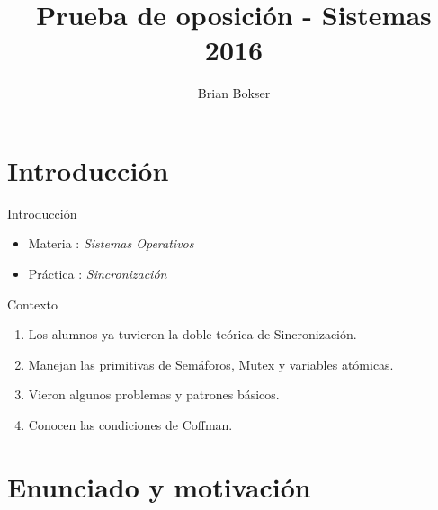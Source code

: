 \documentclass[pdf]{beamer}
\title[Prueba de oposición] %
{Prueba de oposición - Sistemas 2016}
\author[Brian Bokser] %
{Brian Bokser}
\institute[UBA-FCEN] %
{
  Facultad de Ciencias Exactas y Naturales\\
  Universidad de Buenos Aires
}
\begin{document}
\begin{frame}
  \titlepage
\end{frame}




\section{Introducci\'on}

\begin{frame}{Introducci\'on}
    \begin{itemize}
	\item Materia :  \emph{Sistemas Operativos}
	\vspace{2em}
	\item Práctica : \emph{Sincronización}

    \end{itemize}

\end{frame}

\begin{frame}{Contexto}
    \begin{enumerate}
        
        \item{Los alumnos ya tuvieron la doble teórica de Sincronización. }
        \vspace{2em}
        \item{Manejan las primitivas de Semáforos, Mutex y variables atómicas.}
        \vspace{2em}
        \item{Vieron algunos problemas y patrones básicos.} 
        \vspace{2em}
        \item{Conocen las condiciones de Coffman.}
        
    \end{enumerate}
\end{frame}

\section{Enunciado y motivación}
\end{document}
